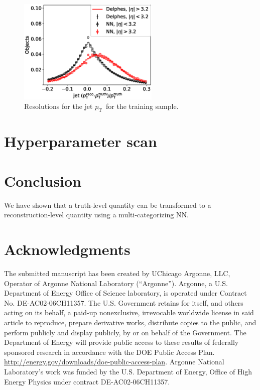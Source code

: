 \documentclass[showpacs,showkeys,preprint,prd,nofootinbib,linenumbers,12pt]{revtex4-1}
\def\pt{\ensuremath{p_{\mathrm{T}}}}
\begin{document}
\begin{figure}[htb]
  \includegraphics[width=0.6\textwidth]{figures/nn/jet_pTResEta_batchSize10.eps}
  \caption{Resolutions for the jet \pt\ for the training sample. }
  \label{fig:nnRes}
\end{figure}

\section{Hyperparameter scan}


\section{Conclusion}
We have shown that a truth-level quantity can be transformed to a reconstruction-level quantity using a multi-categorizing NN. 

\section*{Acknowledgments}
The submitted manuscript has been created by UChicago Argonne, LLC, Operator of Argonne National Laboratory (“Argonne”). Argonne, a U.S.  Department of Energy Office of Science laboratory, is operated under Contract No. DE-AC02-06CH11357. The U.S. Government retains for itself, 
and others acting on its behalf, a paid-up nonexclusive, irrevocable worldwide license in said article to reproduce, prepare derivative works, distribute copies to the public, and perform publicly and display publicly, by or on behalf of the Government.  The Department of Energy will provide public access to these results of federally sponsored research in accordance with the 
DOE Public Access Plan. \url{http://energy.gov/downloads/doe-public-access-plan}. Argonne National Laboratory’s work was funded by the U.S. Department of Energy, Office of High Energy Physics under contract DE-AC02-06CH11357. 



\end{document}
